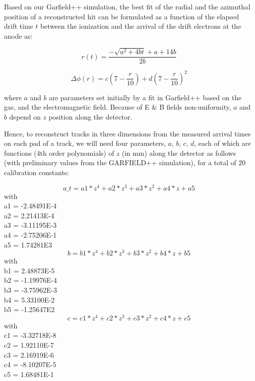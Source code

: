 \documentclass[12pt]{article}
\begin{document}
  Based on our Garfield++ simulation, the best fit of the radial and the azimuthal 
  position  of a reconstructed hit can be formulated as a function of the elapsed drift time $t$ 
  between the ionization and the arrival of the drift electrons at the anode as: 

\begin{equation}
    r(t)= \frac{-\sqrt{a^2 + 4bt} + a + 14b}{2b}
\end{equation}
  
\begin{equation}
   \Delta \phi (r)= c(7-\frac{r}{10}) + d(7-\frac{r}{10})^2
\end{equation}
  
where $a$ and $b$ are parameters set initially by a fit in Garfield++
based on the gas, and the electromagnetic field. Because of E \& B fields 
non-uniformity, $a$ and $b$ depend on $z$ position along the detector. 

   
   Hence, to reconstruct tracks in three dimensions from the measured arrival times on each
   pad of a track, we will need 
   four parameters, $a$, $b$, $c$, $d$, each of which are functions (4th order polynomials) of $z$ (in mm) along 
   the detector as follows (with preliminary values from the GARFIELD++ simulation), for a total of 20
   calibration constants:

\begin{equation}
a\_t = a1 * z^4 + a2 * z^3 + a3 *z^2 + a4 * z + a5
\end{equation}
with\\
a1 = -2.48491E-4\\
a2 = 2.21413E-4\\
a3 = -3.11195E-3\\
a4 = -2.75206E-1\\
a5 = 1.74281E3\\

\begin{equation}
b = b1 * z^4 + b2 * z^3 + b3 *z^2 + b4 * z + b5
\end{equation}
with\\
b1 = 2.48873E-5\\
b2 = -1.19976E-4\\
b3 = -3.75962E-3\\
b4 = 5.33100E-2\\
b5 = -1.25647E2\\


\begin{equation}
c = c1 * z^4 + c2 * z^3 + c3 *z^2 + c4 * z + c5
\end{equation}
with\\
c1 = -3.32718E-8\\
c2 = 1.92110E-7\\
c3 = 2.16919E-6\\
c4 = -8.10207E-5\\
c5 = 1.68481E-1\\
\end{document}
